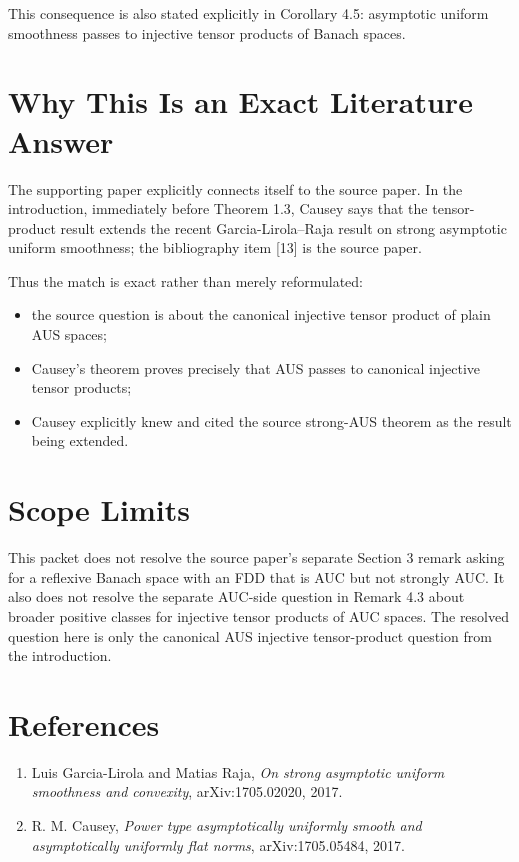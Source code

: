 \documentclass[11pt]{article}
\begin{document}
This consequence is also stated explicitly in Corollary 4.5: asymptotic uniform
smoothness passes to injective tensor products of Banach spaces.

\section*{Why This Is an Exact Literature Answer}

The supporting paper explicitly connects itself to the source paper.  In the
introduction, immediately before Theorem 1.3, Causey says that the tensor-product
result extends the recent Garcia-Lirola--Raja result on strong asymptotic
uniform smoothness; the bibliography item [13] is the source paper.

Thus the match is exact rather than merely reformulated:
\begin{itemize}
\item the source question is about the canonical injective tensor product of
plain AUS spaces;
\item Causey's theorem proves precisely that AUS passes to canonical injective
tensor products;
\item Causey explicitly knew and cited the source strong-AUS theorem as the
result being extended.
\end{itemize}

\section*{Scope Limits}

This packet does not resolve the source paper's separate Section 3 remark asking
for a reflexive Banach space with an FDD that is AUC but not strongly AUC.  It
also does not resolve the separate AUC-side question in Remark 4.3 about broader
positive classes for injective tensor products of AUC spaces.  The resolved
question here is only the canonical AUS injective tensor-product question from
the introduction.

\section*{References}

\begin{enumerate}
\item Luis Garcia-Lirola and Matias Raja, \emph{On strong asymptotic uniform
smoothness and convexity}, arXiv:1705.02020, 2017.
\item R. M. Causey, \emph{Power type asymptotically uniformly smooth and
asymptotically uniformly flat norms}, arXiv:1705.05484, 2017.
\end{enumerate}
\end{document}
